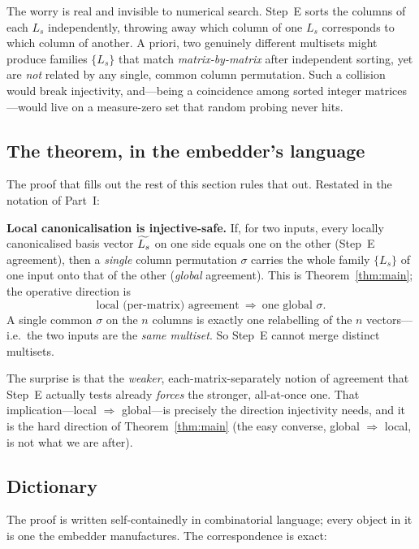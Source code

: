 The worry is real and invisible to numerical search.  Step~E sorts the columns
of each $L_s$ independently, throwing away which column of one $L_s$ corresponds
to which column of another.  A priori, two genuinely different multisets might
produce families $\{L_s\}$ that match \emph{matrix-by-matrix} after independent
sorting, yet are \emph{not} related by any single, common column permutation.
Such a collision would break injectivity, and---being a coincidence among
sorted integer matrices---would live on a measure-zero set that random probing
never hits.

\subsection*{The theorem, in the embedder's language}

The proof that fills out the rest of this section rules that out.  Restated in the
notation of Part~I:

\begin{tcolorbox}[keybox]
\textbf{Local canonicalisation is injective-safe.}
If, for two inputs, every locally canonicalised basis vector $\widetilde{L_s}$ on
one side equals one on the other (Step~E agreement), then a \emph{single}
column permutation $\sigma$ carries the whole family $\{L_s\}$ of one input onto
that of the other (\emph{global} agreement).  This is
Theorem~\ref{thm:main}; the operative direction is
\[
\text{local (per-matrix) agreement}\ \Longrightarrow\ \text{one global }\sigma.
\]
A single common $\sigma$ on the $n$ columns is exactly one relabelling of the
$n$ vectors---i.e.\ the two inputs are the \emph{same multiset}.  So Step~E
cannot merge distinct multisets.
\end{tcolorbox}

\noindent
The surprise is that the \emph{weaker}, each-matrix-separately notion of
agreement that Step~E actually tests already \emph{forces} the stronger,
all-at-once one.  That implication---local $\Rightarrow$ global---is precisely
the direction injectivity needs, and it is the hard direction of
Theorem~\ref{thm:main} (the easy converse, global $\Rightarrow$ local, is not
what we are after).

\subsection*{Dictionary}

The proof is written self-containedly in combinatorial language; every object
in it is one the embedder manufactures.  The correspondence is exact:

